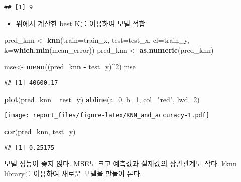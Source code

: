 \documentclass[]{article}
\newenvironment{Shaded}{\begin{snugshade}}{\end{snugshade}}
\newcommand{\DataTypeTok}[1]{\textcolor[rgb]{0.13,0.29,0.53}{#1}}
\newcommand{\DecValTok}[1]{\textcolor[rgb]{0.00,0.00,0.81}{#1}}
\newcommand{\KeywordTok}[1]{\textcolor[rgb]{0.13,0.29,0.53}{\textbf{#1}}}
\newcommand{\NormalTok}[1]{#1}
\newcommand{\OperatorTok}[1]{\textcolor[rgb]{0.81,0.36,0.00}{\textbf{#1}}}
\newcommand{\StringTok}[1]{\textcolor[rgb]{0.31,0.60,0.02}{#1}}
\providecommand{\tightlist}{%
  \setlength{\itemsep}{0pt}\setlength{\parskip}{0pt}}
\begin{document}
\begin{verbatim}
## [1] 9
\end{verbatim}

\begin{itemize}
\tightlist
\item
  위에서 계산한 best K를 이용하여 모델 적합
\end{itemize}

\begin{Shaded}
\begin{Highlighting}[]
\NormalTok{pred_knn <-}\StringTok{ }\KeywordTok{knn}\NormalTok{(}\DataTypeTok{train=}\NormalTok{train_x, }\DataTypeTok{test=}\NormalTok{test_x, }\DataTypeTok{cl=}\NormalTok{train_y, }\DataTypeTok{k=}\KeywordTok{which.min}\NormalTok{(mean_error))}
\NormalTok{pred_knn <-}\StringTok{ }\KeywordTok{as.numeric}\NormalTok{(pred_knn)}

\NormalTok{mse<-}\StringTok{ }\KeywordTok{mean}\NormalTok{((pred_knn }\OperatorTok{-}\StringTok{ }\NormalTok{test_y)}\OperatorTok{^}\DecValTok{2}\NormalTok{)}
\NormalTok{mse}
\end{Highlighting}
\end{Shaded}

\begin{verbatim}
## [1] 40600.17
\end{verbatim}

\begin{Shaded}
\begin{Highlighting}[]
\KeywordTok{plot}\NormalTok{(pred_knn }\OperatorTok{~}\StringTok{ }\NormalTok{test_y)}
\KeywordTok{abline}\NormalTok{(}\DataTypeTok{a=}\DecValTok{0}\NormalTok{, }\DataTypeTok{b=}\DecValTok{1}\NormalTok{, }\DataTypeTok{col=}\StringTok{"red"}\NormalTok{, }\DataTypeTok{lwd=}\DecValTok{2}\NormalTok{)}
\end{Highlighting}
\end{Shaded}

\texttt{[image: report\_files/figure-latex/KNN\_and\_accuracy-1.pdf]}

\begin{Shaded}
\begin{Highlighting}[]
\KeywordTok{cor}\NormalTok{(pred_knn, test_y)}
\end{Highlighting}
\end{Shaded}

\begin{verbatim}
## [1] 0.25175
\end{verbatim}

모델 성능이 좋지 않다. MSE도 크고 예측값과 실제값의 상관관계도 작다.
kknn library를 이용하여 새로운 모델을 만들어 본다.
\end{document}
